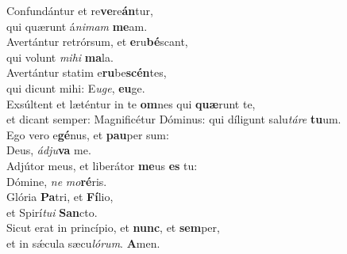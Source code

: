 \evenverse Confundántur et re\textbf{ve}re\textbf{án}tur,~\*\\
\evenverse qui quærunt á\textit{ni}\textit{mam} \textbf{me}am.\\
\oddverse Avertántur retrórsum, et \textbf{e}ru\textbf{bé}scant,~\*\\
\oddverse qui volunt \textit{mi}\textit{hi} \textbf{ma}la.\\
\evenverse Avertántur statim e\textbf{ru}be\textbf{scén}tes,~\*\\
\evenverse qui dicunt mihi: E\textit{u}\textit{ge}, \textbf{e}\textbf{u}ge.\\
\oddverse Exsúltent et læténtur in te \textbf{om}nes qui \textbf{quæ}runt te,~\*\\
\oddverse et dicant semper: Magnificétur Dóminus: qui díligunt salu\textit{tá}\textit{re} \textbf{tu}um.\\
\evenverse Ego vero e\textbf{gé}nus, et \textbf{pau}per sum:~\*\\
\evenverse Deus, \textit{ád}\textit{ju}\textbf{va} me.\\
\oddverse Adjútor meus, et liberátor \textbf{me}us \textbf{es} tu:~\*\\
\oddverse Dómine, \textit{ne} \textit{mo}\textbf{ré}ris.\\
\evenverse Glória \textbf{Pa}tri, et \textbf{Fí}lio,~\*\\
\evenverse et Spirí\textit{tu}\textit{i} \textbf{San}cto.\\
\oddverse Sicut erat in princípio, et \textbf{nunc}, et \textbf{sem}per,~\*\\
\oddverse et in sǽcula sæcu\textit{ló}\textit{rum}. \textbf{A}men.\\
